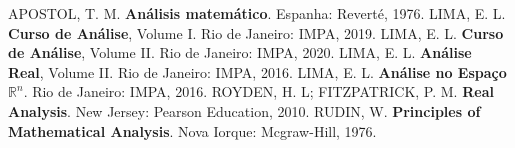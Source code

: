 \documentclass[12pt]{article}
\theoremstyle{definition}
\begin{document}
\begin{thebibliography}{99}
	 APOSTOL, T. M. \textbf{Análisis matemático}. Espanha: Reverté, 1976.
	 LIMA, E. L. \textbf{Curso de Análise}, Volume I. Rio de Janeiro: IMPA, 2019.
	 LIMA, E. L. \textbf{Curso de Análise}, Volume II. Rio de Janeiro: IMPA, 2020.
	 LIMA, E. L. \textbf{Análise Real}, Volume II. Rio de Janeiro: IMPA, 2016.
	 LIMA, E. L. \textbf{Análise no Espaço} \(\mathbb{R}^{n}\). Rio de Janeiro: IMPA, 2016.
	 ROYDEN, H. L; FITZPATRICK, P. M. \textbf{Real Analysis}. New Jersey: Pearson Education, 2010.
	 RUDIN, W. \textbf{Principles of Mathematical Analysis}. Nova Iorque: Mcgraw-Hill, 1976.
\end{thebibliography}
 
\end{document}
